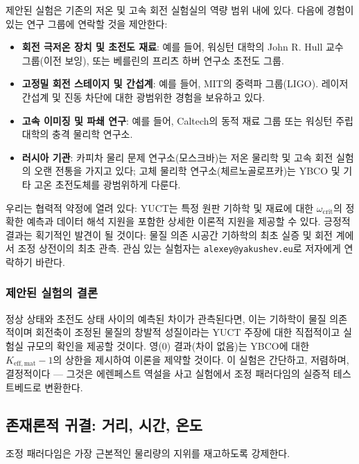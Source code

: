 \documentclass[12pt,a4paper]{article}
\begin{document}
	제안된 실험은 기존의 저온 및 고속 회전 실험실의 역량 범위 내에 있다. 다음에 경험이 있는 연구 그룹에 연락할 것을 제안한다:
	\begin{itemize}
		\item \textbf{회전 극저온 장치 및 초전도 재료}: 예를 들어, 워싱턴 대학의 John R. Hull 교수 그룹(이전 보잉), 또는 베를린의 프리츠 하버 연구소 초전도 그룹.
		\item \textbf{고정밀 회전 스테이지 및 간섭계}: 예를 들어, MIT의 중력파 그룹(LIGO). 레이저 간섭계 및 진동 차단에 대한 광범위한 경험을 보유하고 있다.
		\item \textbf{고속 이미징 및 파쇄 연구}: 예를 들어, Caltech의 동적 재료 그룹 또는 워싱턴 주립 대학의 충격 물리학 연구소.
		\item \textbf{러시아 기관}: 카피차 물리 문제 연구소(모스크바)는 저온 물리학 및 고속 회전 실험의 오랜 전통을 가지고 있다; 고체 물리학 연구소(체르노골로프카)는 YBCO 및 기타 고온 초전도체를 광범위하게 다룬다.
	\end{itemize}
	
	우리는 협력적 약정에 열려 있다: YUCT는 특정 원판 기하학 및 재료에 대한 \(\omega_{\text{crit}}\)의 정확한 예측과 데이터 해석 지원을 포함한 상세한 이론적 지원을 제공할 수 있다. 긍정적 결과는 획기적인 발견이 될 것이다: 물질 의존 시공간 기하학의 최초 실증 및 회전 계에서 조정 상전이의 최초 관측. 관심 있는 실험자는 \texttt{alexey@yakushev.eu}로 저자에게 연락하기 바란다.
	
	\subsubsection{제안된 실험의 결론}
	
	정상 상태와 초전도 상태 사이의 예측된 차이가 관측된다면, 이는 기하학이 물질 의존적이며 회전축이 조정된 물질의 창발적 성질이라는 YUCT 주장에 대한 직접적이고 실험실 규모의 확인을 제공할 것이다. 영(0) 결과(차이 없음)는 YBCO에 대한 \(K_{\mathrm{eff,mat}} - 1\)의 상한을 제시하여 이론을 제약할 것이다. 이 실험은 간단하고, 저렴하며, 결정적이다 — 그것은 에렌페스트 역설을 사고 실험에서 조정 패러다임의 실증적 테스트베드로 변환한다.
	
	\subsection{존재론적 귀결: 거리, 시간, 온도}
	
	조정 패러다임은 가장 근본적인 물리량의 지위를 재고하도록 강제한다.
	
\end{document}

